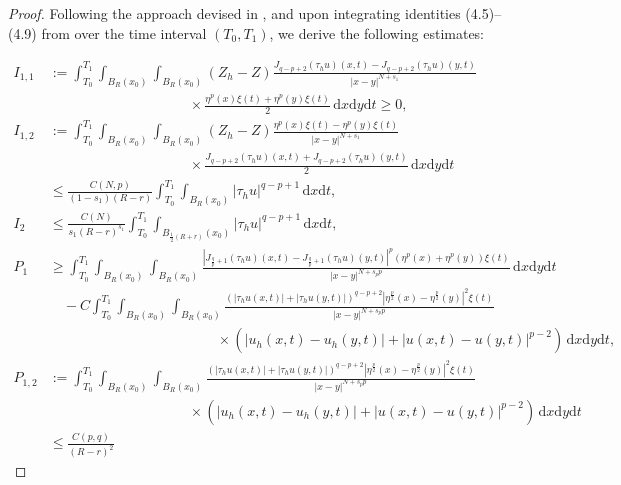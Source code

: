 \documentclass[reqno,10pt]{amsart}
\numberwithin{equation}{section}
\begin{document}
\begin{proof}
	Following the approach devised in \cite[Proof of Proposition 4.2]{LZ25}, and upon integrating identities (4.5)–(4.9) from \cite{LZ25} over the time interval $(T_0, T_1)$, we derive the following estimates:
	
	\begin{align}
		\label{4.1}
		I_{1,1}&:=\int_{T_0}^{T_1}\int_{B_R(x_0)}\int_{B_R(x_0)}(Z_h-Z)
		\frac{J_{q-p+2}(\tau_hu)(x,t)-J_{q-p+2}(\tau_hu)(y,t)}{|x-y|^{N+s_1}} \nonumber\\
		&\qquad\qquad\qquad\qquad\qquad\times 
		\frac{\eta^p(x)\xi(t)+\eta^p(y)\xi(t)}{2}
		\,\mathrm{d}x\mathrm{d}y\mathrm{d}t\ge0,
		\\[6pt]
		\label{4.2}
		I_{1,2}&:=\int_{T_0}^{T_1}\int_{B_R(x_0)}\int_{B_R(x_0)}(Z_h-Z)
		\frac{\eta^p(x)\xi(t)-\eta^p(y)\xi(t)}{|x-y|^{N+s_1}} \nonumber\\
		&\qquad\qquad\qquad\qquad\qquad\times
		\frac{J_{q-p+2}(\tau_hu)(x,t)+J_{q-p+2}(\tau_hu)(y,t)}{2}
		\,\mathrm{d}x\mathrm{d}y\mathrm{d}t\nonumber\\
		&\le
		\frac{C(N,p)}{(1-s_1)(R-r)}
		\int_{T_0}^{T_1}\int_{B_R(x_0)}
		|\tau_hu|^{q-p+1}\,\mathrm{d}x\mathrm{d}t,
		\\[6pt]
		\label{4.3}
		I_2
		&\le
		\frac{C(N)}{s_1(R-r)^{s_1}}
		\int_{T_0}^{T_1}\int_{B_{\frac12(R+r)}(x_0)}
		|\tau_hu|^{q-p+1}\,\mathrm{d}x\mathrm{d}t,
		\\[6pt]
		\label{4.4}
		P_1
		&\ge
		\int_{T_0}^{T_1}\int_{B_R(x_0)}\int_{B_R(x_0)}
		\frac{|J_{\frac{q}{p}+1}(\tau_hu)(x,t)-J_{\frac{q}{p}+1}(\tau_hu)(y,t)|^p
			(\eta^p(x)+\eta^p(y))\xi(t)}
		{|x-y|^{N+s_pp}}
		\,\mathrm{d}x\mathrm{d}y\mathrm{d}t
		\nonumber\\
		&\quad-
		C\int_{T_0}^{T_1}\int_{B_R(x_0)}\int_{B_R(x_0)}
		\frac{(|\tau_hu(x,t)|+|\tau_hu(y,t)|)^{q-p+2}
			|\eta^{\frac p2}(x)-\eta^{\frac p2}(y)|^2\xi(t)}
		{|x-y|^{N+s_pp}}
		\nonumber\\
		&\qquad\qquad\qquad\qquad\qquad\qquad\times
		\left(|u_h(x,t)-u_h(y,t)|+|u(x,t)-u(y,t)|^{p-2}\right)
		\,\mathrm{d}x\mathrm{d}y\mathrm{d}t,
		\\[6pt]
		\label{4.5}
		P_{1,2}
		&:=
		\int_{T_0}^{T_1}\int_{B_R(x_0)}\int_{B_R(x_0)}
		\frac{(|\tau_hu(x,t)|+|\tau_hu(y,t)|)^{q-p+2}
			|\eta^{\frac p2}(x)-\eta^{\frac p2}(y)|^2\xi(t)}
		{|x-y|^{N+s_pp}}
		\nonumber\\
		&\qquad\qquad\qquad\qquad\qquad\times
		\left(|u_h(x,t)-u_h(y,t)|+|u(x,t)-u(y,t)|^{p-2}\right)
		\,\mathrm{d}x\mathrm{d}y\mathrm{d}t\nonumber\\
		&\le
		\frac{C(p,q)}{(R-r)^2}

\end{align}
\end{proof}
\end{document}
